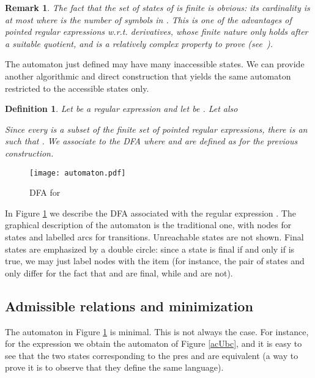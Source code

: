 \documentclass[preprint]{sigplanconf}
\newcounter{item}
\newtheorem{definition}[item]{Definition}
\newtheorem{remark}[item]{Remark}
\begin{document}
\begin{remark}\label{card}The fact that the set  of states of  
is finite is obvious: its cardinality is at most  where  is 
the number of symbols in . This is one of the advantages
of pointed regular expressions w.r.t. derivatives, whose finite
nature only holds after a suitable quotient, and is a relatively
complex property to prove (see~\cite{Brzozowski64}).
\end{remark} 

\noindent
The automaton  just defined may have many inaccessible states. We can
provide another algorithmic and direct construction that yields the same
automaton restricted to the accessible states only.

\begin{definition}\label{algorithmic1}
Let  be a regular expression and let  be .
Let also
 
 Since every  is a subset of the finite set of pointed regular expressions, there is an  such that .
We associate to  the DFA  where  and 
are defined as for the previous construction.
\end{definition}

\begin{figure}[htp]
\begin{center}
\texttt{[image: automaton.pdf]}
\caption{DFA for \label{automaton}}
\end{center}
\end{figure}

In Figure \ref{automaton} we describe the DFA
associated with the regular expression .
The graphical description of the automaton is the traditional one,
with nodes for states and labelled arcs for transitions. 
Unreachable states are not shown.
Final states are emphasized by a double circle: since a state
 is final if and only if  is true, we
may just label nodes with the item (for instance, the pair of
states  and  only differ for the fact that  and  
are final, while  and  are not).  



\subsection{Admissible relations and minimization}
The automaton in Figure \ref{automaton} is minimal. This is
not always the case. For instance, for the expression 
 we obtain the automaton of Figure \ref{acUbc}, and 
it is easy to see that the two states corresponding to the
pres  and  are equivalent
(a way to prove it is to observe that they define the same
language). 
\end{document}
